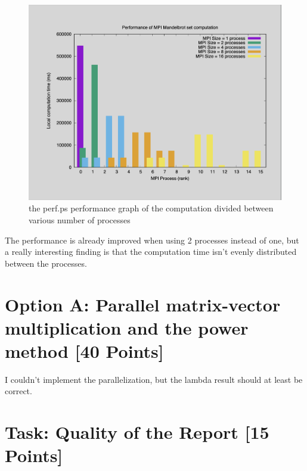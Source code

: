 \documentclass[unicode,11pt,a4paper,oneside,numbers=endperiod,openany]{scrartcl}
\begin{document}
\begin{figure}[H]
\centering
\includegraphics[width=0.6\linewidth]{perf.png}
\caption{the perf.ps performance graph of the computation divided between various number of processes}
\end{figure}

The performance is already improved when using 2 processes instead of one, but a really interesting finding is that the computation time isn't evenly distributed between the processes.


\section{Option A: Parallel matrix-vector multiplication and the power method [40 Points]}

I couldn't implement the parallelization, but the lambda result should at least be correct.

\section{Task:  Quality of the Report [15 Points]}
\end{document}
